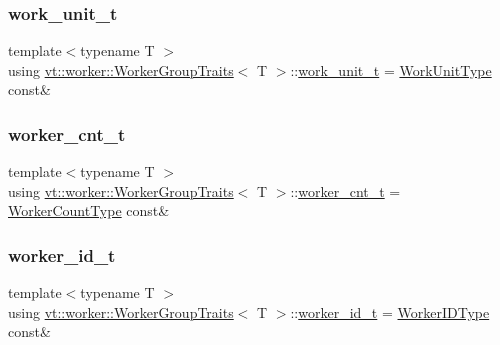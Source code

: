 \subsubsection{\texorpdfstring{work\+\_\+unit\+\_\+t}{work\_unit\_t}}
{\footnotesize\ttfamily template$<$typename T $>$ \\
using \hyperlink{structvt_1_1worker_1_1_worker_group_traits}{vt\+::worker\+::\+Worker\+Group\+Traits}$<$ T $>$\+::\hyperlink{structvt_1_1worker_1_1_worker_group_traits_ae7c108d04180f59f3e2cd4fa065be4b0}{work\+\_\+unit\+\_\+t} =  \hyperlink{namespacevt_1_1worker_a59d2fcdafa81fc0af7f921a258e42202}{Work\+Unit\+Type} const\&}

\mbox{\label{structvt_1_1worker_1_1_worker_group_traits_ab532e883384999599393386ba277a84a}} 
\subsubsection{\texorpdfstring{worker\+\_\+cnt\+\_\+t}{worker\_cnt\_t}}
{\footnotesize\ttfamily template$<$typename T $>$ \\
using \hyperlink{structvt_1_1worker_1_1_worker_group_traits}{vt\+::worker\+::\+Worker\+Group\+Traits}$<$ T $>$\+::\hyperlink{structvt_1_1worker_1_1_worker_group_traits_ab532e883384999599393386ba277a84a}{worker\+\_\+cnt\+\_\+t} =  \hyperlink{namespacevt_aa93398ea48f2cb6c188512250f7cc248}{Worker\+Count\+Type} const\&}

\mbox{\label{structvt_1_1worker_1_1_worker_group_traits_a227b8add8f3fae6004adc05d5e85204f}} 
\subsubsection{\texorpdfstring{worker\+\_\+id\+\_\+t}{worker\_id\_t}}
{\footnotesize\ttfamily template$<$typename T $>$ \\
using \hyperlink{structvt_1_1worker_1_1_worker_group_traits}{vt\+::worker\+::\+Worker\+Group\+Traits}$<$ T $>$\+::\hyperlink{structvt_1_1worker_1_1_worker_group_traits_a227b8add8f3fae6004adc05d5e85204f}{worker\+\_\+id\+\_\+t} =  \hyperlink{namespacevt_a656e362091da17b9b93d0655b36e3392}{Worker\+I\+D\+Type} const\&}

